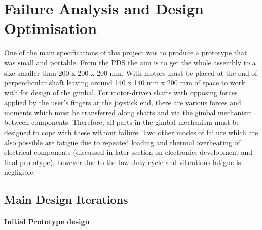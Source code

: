 


\section{Failure Analysis and Design Optimisation} %
\label{sec:failure_analysis_and_design_optimisation}

One of the main specifications of this project was to produce a prototype that was small
and portable. From the PDS the aim is to get the whole assembly to a size smaller than 200 x 200 x 200 mm. With motors must be placed at the end of perpendicular shaft leaving around 140 x 140 mm x 200 mm of space to work with for design of the gimbal.
For motor-driven shafts with opposing forces applied by the user’s fingers at the joystick end, there are various forces and moments which must be transferred along shafts and via the gimbal mechanism between components. Therefore, all parts in the gimbal mechanism must be designed to cope with these without failure.
Two other modes of failure which are also possible are fatigue due to repeated loading and thermal overheating of electrical components (discussed in later section on electronics development and final prototype), however due to the low duty cycle and vibrations fatigue is negligible.

\subsection{Main Design Iterations} %
\label{sub:main_design_iterations}

\paragraph{Initial Prototype design} %
\label{par:initial_prototype_design}

